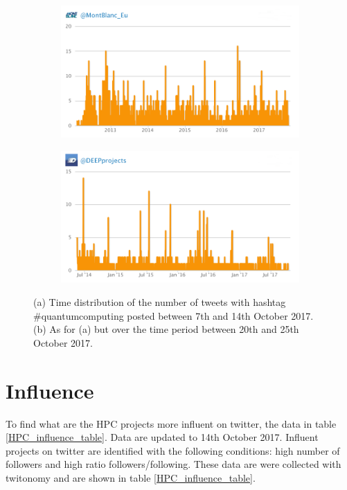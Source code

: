 \begin{figure}
 \centering
 \begin{subfigure}[t]{0.9\textwidth}
   \includegraphics[width=1\linewidth]{Images/Tweets_Montblanc.png}
   \caption{} 
 \end{subfigure}

 \begin{subfigure}[t]{0.9\textwidth}
   \includegraphics[width=1\linewidth]{Images/Tweets_Deepest.png}
   \caption{}
 \end{subfigure}
 \caption{(a) Time distribution of the number of tweets with hashtag \#quantumcomputing posted between 7th and 14th October 2017. (b) As for (a) but over the time period between 20th and 25th October 2017.} 
 \label{Tweets_Montblanc-Deepest}
\end{figure}

\section{Influence}
To find what are the HPC projects more influent on twitter, the data in table \ref{HPC_influence_table}. Data are updated to 14th October 2017. Influent projects on twitter are identified with the following conditions: high number of followers and high ratio followers/following. These data are were collected with twitonomy and are shown in table \ref{HPC_influence_table}.

